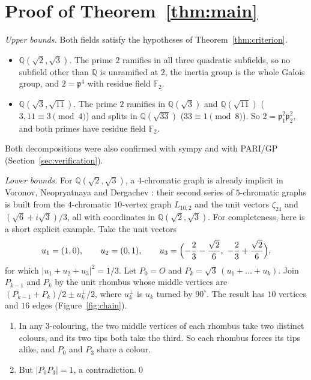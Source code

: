 \documentclass[11pt,a4paper]{amsart}
\theoremstyle{remark}
\newcommand{\F}{\mathbb{F}}
\newcommand{\Q}{\mathbb{Q}}
\newcommand{\p}{\mathfrak{p}}
\begin{document}
\section{Proof of Theorem~\ref{thm:main}}

\emph{Upper bounds.} Both fields satisfy the hypotheses of Theorem~\ref{thm:criterion}.
\begin{itemize}
\item $\Q(\sqrt2,\sqrt3)$. The prime $2$ ramifies in all three quadratic subfields, so no subfield other than
$\Q$ is unramified at $2$, the inertia group is the whole Galois group, and $2=\p^4$ with residue field $\F_2$.
\item $\Q(\sqrt3,\sqrt{11})$. The prime $2$ ramifies in $\Q(\sqrt3)$ and $\Q(\sqrt{11})$ ($3,11\equiv3\pmod 4$)
and splits in $\Q(\sqrt{33})$ ($33\equiv1\pmod 8$). So $2=\p_1^2\p_2^2$, and both primes have residue field
$\F_2$.
\end{itemize}
Both decompositions were also confirmed with sympy and with PARI/GP (Section~\ref{sec:verification}).

\emph{Lower bounds.} For $\Q(\sqrt2,\sqrt3)$, a $4$-chromatic graph is already implicit in Voronov, Neopryatnaya
and Dergachev \cite{VND}: their second series of $5$-chromatic graphs is built from the $4$-chromatic $10$-vertex
graph $L_{10,2}$ and the unit vectors $\zeta_{24}$ and $(\sqrt6+i\sqrt3)/3$, all with coordinates in
$\Q(\sqrt2,\sqrt3)$. For completeness, here is a short explicit example. Take the unit vectors
\[
u_1=(1,0),\qquad u_2=(0,1),\qquad u_3=\Bigl(-\frac23-\frac{\sqrt2}6,\ -\frac23+\frac{\sqrt2}6\Bigr),
\]
for which $|u_1+u_2+u_3|^2=1/3$. Let $P_0=O$ and $P_k=\sqrt3\,(u_1+\dots+u_k)$. Join $P_{k-1}$ and $P_k$ by the
unit rhombus whose middle vertices are $(P_{k-1}+P_k)/2\pm u_k^\perp/2$, where $u_k^\perp$ is $u_k$ turned by
$90^\circ$. The result has $10$ vertices and $16$ edges (Figure~\ref{fig:chain}).
\begin{enumerate}
\item In any $3$-colouring, the two middle vertices of each rhombus take two distinct colours, and its two tips
both take the third. So each rhombus forces its tips alike, and $P_0$ and $P_3$ share a colour.
\item But $|P_0P_3|=1$, a contradiction.\qed
\end{enumerate}
\end{document}
